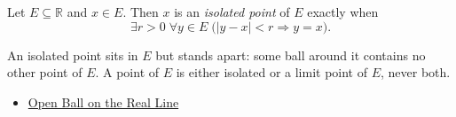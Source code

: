 \begin{tcolorbox}[colback=defbox, colframe=defborder, arc=2pt,
  left=6pt, right=6pt, top=4pt, bottom=4pt,
  title={\small\textbf{Definition (Isolated Point)}},
  fonttitle=\small\bfseries]
\begin{definition}
\label{def:isolated-point}
Let $E\subseteq\mathbb{R}$ and $x\in E$. Then $x$ is an \emph{isolated point} of $E$ exactly when
\[
\exists r>0\;\forall y\in E\;\bigl(|y-x|<r \Rightarrow y=x\bigr).
\]
\end{definition}
\end{tcolorbox}
\begin{remark*}[Interpretation]
An isolated point sits in $E$ but stands apart: some ball around it contains no other point of $E$. A point of $E$ is either isolated or a limit point of $E$, never both.
\end{remark*}
\begin{dependencies}
\begin{itemize}
  \item \hyperref[def:open-ball]{Open Ball on the Real Line}
\end{itemize}
\end{dependencies}
